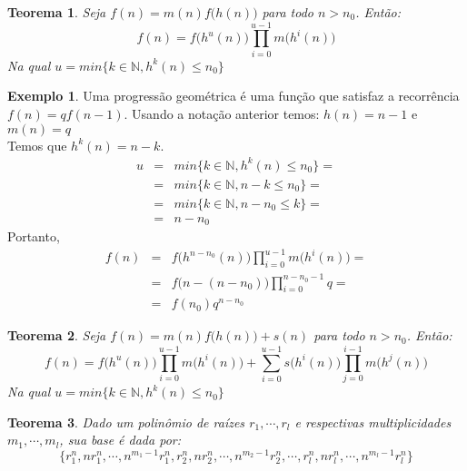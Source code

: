 \documentclass[a4paper,11pt]{article}
\theoremstyle{definition} \newtheorem{definicao}{Def}
\theoremstyle{definition} \newtheorem{exemplo}{Exemplo}
\theoremstyle{plain}      \newtheorem{teorema}{Teorema}
\theoremstyle{remark}     \newtheorem*{corolario}{Corol\'{a}rio}
\begin{document}
\begin{teorema}
Seja $f(n) = m(n)f\Big(h(n)\Big)$ para todo $n > n_0$.
Ent\~{a}o: \\
\begin{equation*}
f(n) = f\Big(h^u(n)\Big)\prod_{i=0}^{u-1}m\Big(h^i(n)\Big)
\end{equation*}
Na qual $u = min\{k \in \mathbb{N}, h^k(n) \leq n_0\}$
\end{teorema}

\begin{exemplo}
Uma progress\~{a}o geom\'{e}trica \'{e} uma fun\c{c}\~{a}o que satisfaz
a recorr\^{e}ncia $f(n) = qf(n-1)$.  Usando a nota\c{c}\~{a}o anterior
temos: $h(n) = n - 1$ e $m(n) = q$ \\
Temos que $h^k(n) = n - k$.
\begin{eqnarray*}
u & = & min\{k \in \mathbb{N}, h^k(n) \leq n_0\} = \\
& = & min\{k \in \mathbb{N}, n - k \leq n_0\} = \\
& = & min\{k \in \mathbb{N}, n - n_0 \leq k\} = \\
& = & n - n_0
\end{eqnarray*}
Portanto,
\begin{eqnarray*}
f(n) & = & f\Big(h^{n-n_0}(n)\Big)\prod_{i=0}^{u-1} m\Big(h^i(n)\Big) = \\
& = & f\Big(n - (n - n_0)\Big)\prod_{i = 0}^{n - n_0 - 1} q = \\
& = & f(n_0) q^{n - n_0}
\end{eqnarray*}
\end{exemplo}

\begin{teorema}
Seja $f(n) = m(n)f\Big(h(n)\Big) + s(n)$ para todo $n > n_0$.
Ent\~{a}o: \\
\begin{equation*}
f(n) = f\Big(h^u(n)\Big)\prod_{i=0}^{u-1}m\Big(h^i(n)\Big) +
\sum_{i=0}^{u-1}s\Big(h^i(n)\Big)\prod_{j=0}^{i-1}m\Big(h^j(n)\Big)
\end{equation*}
Na qual $u = min\{k \in \mathbb{N}, h^k(n) \leq n_0\}$
\end{teorema}

\begin{teorema}
Dado um polin\^{o}mio de ra\'{i}zes $r_1, \cdots, r_{l}$ e respectivas
multiplicidades $m_1, \cdots, m_{l}$, sua base \'{e} dada por:
\begin{equation*}
\Big\{r_1^n, nr_1^n,\cdots,n^{m_1-1}r_1^n,
r_2^n, nr_2^n,\cdots,n^{m_2-1}r_2^n, \cdots,
r_{l}^n, nr_{l}^n,\cdots,n^{m_{l}-1}r_{l}^n\Big\}
\end{equation*}
\end{teorema}
\end{document}
